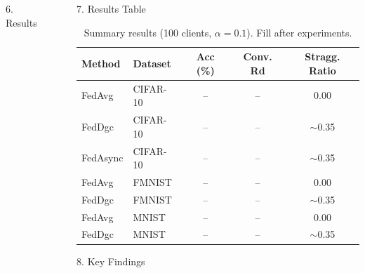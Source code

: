 \documentclass[final]{beamer}
\newlength{\sepwidth}
\newlength{\colwidth}
\newcommand{\separatorcolumn}{\begin{column}{\sepwidth}\end{column}}
\begin{document}
\begin{frame}[t]
\begin{columns}[t]
\begin{column}{\colwidth}
\begin{block}{6. Results}
  \end{block}

\end{column}

\separatorcolumn

\begin{column}{\colwidth}

  \begin{exampleblock}{7. Results Table}

    \begin{table}
      \centering
      \begin{tabular}{l l c c c}
        \toprule
        \textbf{Method} & \textbf{Dataset} & \textbf{Acc (\%)} & \textbf{Conv. Rd} & \textbf{Stragg. Ratio} \\
        \midrule
        FedAvg & CIFAR-10 & -- & -- & 0.00 \\
        FedDgc & CIFAR-10 & -- & -- & $\sim$0.35 \\
        FedAsync & CIFAR-10 & -- & -- & $\sim$0.35 \\
        \midrule
        FedAvg & FMNIST & -- & -- & 0.00 \\
        FedDgc & FMNIST & -- & -- & $\sim$0.35 \\
        \midrule
        FedAvg & MNIST & -- & -- & 0.00 \\
        FedDgc & MNIST & -- & -- & $\sim$0.35 \\
        \bottomrule
      \end{tabular}
      \caption{Summary results (100 clients, $\alpha=0.1$). Fill after experiments.}
    \end{table}

  \end{exampleblock}

  \begin{block}{8. Key Findings}


\end{block}
\end{column}
\end{columns}
\end{frame}
\end{document}
